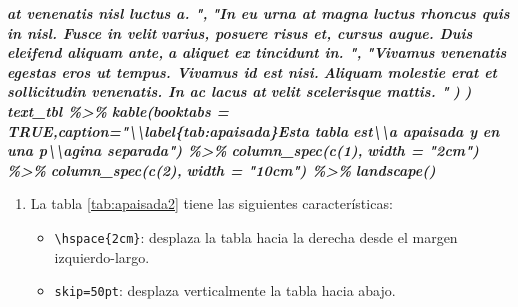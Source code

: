 \documentclass[12pt,a4paper,]{book}
\newenvironment{Shaded}{\begin{snugshade}}{\end{snugshade}}
\newcommand{\InformationTok}[1]{\textcolor[rgb]{0.56,0.35,0.01}{\textbf{\textit{#1}}}}
\providecommand{\tightlist}{%
  \setlength{\itemsep}{0pt}\setlength{\parskip}{0pt}}
\numberwithin{dummy}{section}
\theoremstyle{ocrenumbox}
\theoremstyle{blacknumex}
\theoremstyle{blacknumbox}
\theoremstyle{ocrenum}
\theoremstyle{ocrenum}
\begin{document}
\begin{Shaded}
\begin{Highlighting}[]
\InformationTok{    at venenatis nisl luctus a. ",}
\InformationTok{    "In eu urna at magna luctus rhoncus quis in nisl. Fusce in velit}
\InformationTok{    varius, posuere risus et, cursus augue. Duis eleifend aliquam ante,}
\InformationTok{    a aliquet ex tincidunt in. ",}
\InformationTok{    "Vivamus venenatis egestas eros ut tempus. Vivamus id est nisi.}
\InformationTok{    Aliquam molestie erat et sollicitudin venenatis. In ac lacus at}
\InformationTok{    velit scelerisque mattis. "}
\InformationTok{    ) }
\InformationTok{  )}
\InformationTok{text\_tbl \%\textgreater{}\%}
\InformationTok{  kable(booktabs = TRUE,caption="\textbackslash{}\textbackslash{}label\{tab:apaisada\}Esta tabla }
\InformationTok{          est\textbackslash{}\textbackslash{}\textquotesingle{}a apaisada y en una p\textbackslash{}\textbackslash{}\textquotesingle{}agina separada") \%\textgreater{}\% }
\InformationTok{      column\_spec(c(1), }
\InformationTok{          width = "2cm") \%\textgreater{}\% }
\InformationTok{      column\_spec(c(2), }
\InformationTok{          width = "10cm") \%\textgreater{}\% }
\InformationTok{      landscape()}
\InformationTok{\textasciigrave{}\textasciigrave{}\textasciigrave{}}
\end{Highlighting}
\end{Shaded}

\begin{enumerate}
\def\labelenumi{\arabic{enumi}.}
\setcounter{enumi}{1}
\item
  La tabla \ref{tab:apaisada2} tiene las siguientes características:

  \begin{itemize}
  \tightlist
  \item
    \texttt{\textbackslash{}hspace\{2cm\}}: desplaza la tabla hacia la
    derecha desde el margen izquierdo-largo.
  \item
    \texttt{skip=50pt}: desplaza verticalmente la tabla hacia abajo.
  \end{itemize}
\end{enumerate}
\end{document}
